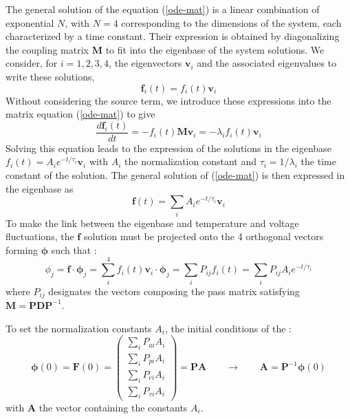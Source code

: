 The general solution of the equation (\ref{ode-mat}) is a linear combination of exponential $N$, with $N=4$ corresponding to the dimensions of the system, each characterized by a time constant. Their expression is obtained by diagonalizing the coupling matrix $\bm{M}$ to fit into the eigenbase of the system solutions. We consider, for $i=1,2,3,4$, the eigenvectors $\bm{v}_i$ and the associated eigenvalues to write these solutions,
\begin{equation}
\label{eigen-soluc}
\bm{f}_i(t) = f_i(t) \bm{v}_i
\end{equation}
Without considering the source term, we introduce these expressions into the matrix equation (\ref{ode-mat}) to give
\begin{equation}
\label{eigen-soluc-ode}
\frac{d \bm{f}_i(t)}{d t} = -f_i(t) \bm{M} \bm{v}_i = -\lambda_i f_i(t) \bm{v}_i
\end{equation}
Solving this equation leads to the expression of the solutions in the eigenbase $f_i(t) = A_i e^{-t/\tau_i} \bm{v}_i$ with $A_i$ the normalization constant and $\tau_i=1/\lambda_i$ the time constant of the solution. The general solution of (\ref{ode-mat}) is then expressed in the eigenbase as
\begin{equation}
\label{eigein-solc-expr}
\bm{f}(t) = \sum_i A_i e^{-t/\tau_i} \bm{v}_i
\end{equation}
To make the link between the eigenbase and temperature and voltage fluctuations, the $\bm{f}$ solution must be projected onto the 4 orthogonal vectors forming $\bm{\phi}$ such that :
\begin{equation}
\label{gen-soluc}
\phi_j = \bm{f} \cdot \bm{\phi}_j = \sum_i^4 f_i(t) \bm{v}_i \cdot \bm{\phi}_j = \sum_i P_{ij} f_i(t) = \sum_i P_{ij} A_i e^{-t/\tau_i}
\end{equation}
where $P_{ij}$ designates the vectors composing the pass matrix satisfying $\bm{M}=\bm{P} \bm{D} \bm{P}^{-1}$.

To set the normalization constants $A_i$, the initial conditions of the :
\begin{equation}
\bm{\phi}(0) = \bm{F}(0) =
\left( \begin{array}{c}
\sum_i P_{ai} A_i\\
\sum_i P_{pi} A_i\\
\sum_i P_{ei} A_i\\
\sum_i P_{vi} A_i
\end{array} \right) = \bm{P} \bm{A}
\qquad \longrightarrow \qquad \bm{A}=\bm{P}^{-1} \bm{\phi} (0)
\label{normal}
\end{equation}
with $\bm{A}$ the vector containing the constants $A_i$.

